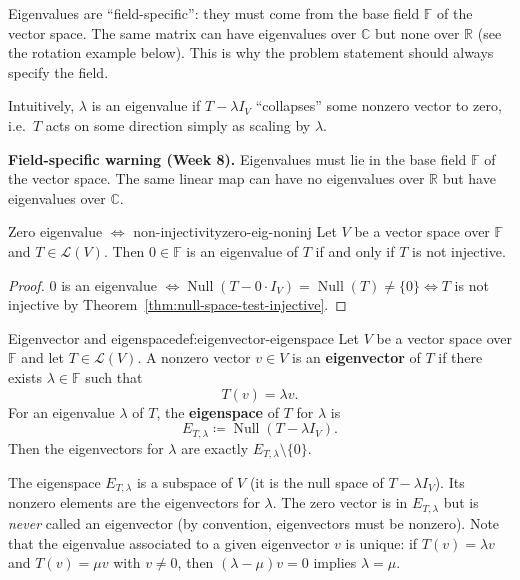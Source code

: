 Eigenvalues are ``field-specific'': they must come from the base field $\mathbb{F}$ of the vector space.
The same matrix can have eigenvalues over $\mathbb{C}$ but none over $\mathbb{R}$ (see the rotation example below).
This is why the problem statement should always specify the field.

Intuitively, $\lambda$ is an eigenvalue if $T-\lambda I_V$ ``collapses'' some nonzero vector to zero, i.e.\ $T$ acts on some direction simply as scaling by $\lambda$.

\begin{keyformula}
\textbf{Field-specific warning (Week 8).}
Eigenvalues must lie in the base field $\mathbb{F}$ of the vector space.
The same linear map can have no eigenvalues over $\mathbb{R}$ but have eigenvalues over $\mathbb{C}$.
\end{keyformula}

\begin{theorem}{Zero eigenvalue $\Longleftrightarrow$ non-injectivity}{zero-eig-noninj}
Let $V$ be a vector space over $\mathbb{F}$ and $T\in\mathcal{L}(V)$.
Then $0\in\mathbb{F}$ is an eigenvalue of $T$ if and only if $T$ is not injective.
\end{theorem}

\begin{proof}
$0$ is an eigenvalue $\Longleftrightarrow \operatorname{Null}(T-0\cdot I_V)=\operatorname{Null}(T)\neq\{0\}
\Longleftrightarrow T$ is not injective by Theorem~\ref{thm:null-space-test-injective}.
\end{proof}

\begin{definition}{Eigenvector and eigenspace}{def:eigenvector-eigenspace}
Let $V$ be a vector space over $\mathbb{F}$ and let $T\in\mathcal{L}(V)$.
A nonzero vector $v\in V$ is an \textbf{eigenvector} of $T$ if there exists $\lambda\in\mathbb{F}$ such that
\[
T(v)=\lambda v.
\]
For an eigenvalue $\lambda$ of $T$, the \textbf{eigenspace} of $T$ for $\lambda$ is
\[
E_{T,\lambda}\coloneqq \operatorname{Null}(T-\lambda I_V).
\]
Then the eigenvectors for $\lambda$ are exactly $E_{T,\lambda}\setminus\{0\}$.

\end{definition}

The eigenspace $E_{T,\lambda}$ is a subspace of $V$ (it is the null space of $T-\lambda I_V$).
Its nonzero elements are the eigenvectors for $\lambda$.
The zero vector is in $E_{T,\lambda}$ but is \emph{never} called an eigenvector (by convention, eigenvectors must be nonzero).
Note that the eigenvalue associated to a given eigenvector $v$ is unique: if $T(v)=\lambda v$ and $T(v)=\mu v$ with $v\neq 0$, then $(\lambda-\mu)v=0$ implies $\lambda=\mu$.

